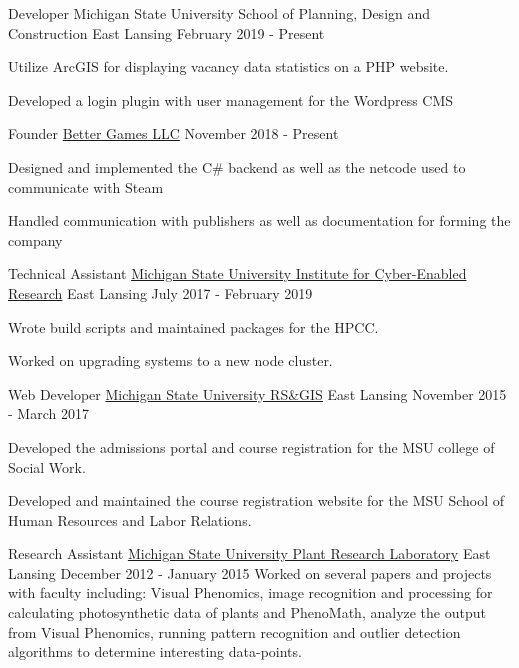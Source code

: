 
\begin{cventries}
  \cventry
  {Developer}
  {Michigan State University School of Planning, Design and Construction}
  {East Lansing}
  {February 2019 - Present}
  {
    \begin{cvitems}
      \item {Utilize ArcGIS for displaying vacancy data statistics on a PHP website.}
      \item {Developed a login plugin with user management for the Wordpress CMS}
    \end{cvitems}
  }

  \cventry
    {Founder} %
    {\href{https://better-games.org}{Better Games LLC}} %
    {} %
    {November 2018 - Present} %
    {
        \begin{cvitems}
          \item {Designed and implemented the C\# backend as well as the netcode used to communicate with Steam}
          \item {Handled communication with publishers as well as documentation for forming the company}
        \end{cvitems}
    }

  \cventry
    {Technical Assistant}
    {\href{https://icer.msu.edu}{Michigan State University Institute for Cyber-Enabled Research}}
    {East Lansing}
    {July 2017 - February 2019}
    {
      \begin{cvitems}
        \item {Wrote build scripts and maintained packages for the HPCC.}
        \item {Worked on upgrading systems to a new node cluster.}
      \end{cvitems}
    }

  \cventry
    {Web Developer}
    {\href{http://www.rsgis.msu.edu}{Michigan State University RS\&GIS}}
    {East Lansing}
    {November 2015 - March 2017}
    {
      \begin{cvitems}
        \item {Developed the admissions portal and course registration for the MSU college of Social Work.}
        \item {Developed and maintained the course registration website for the MSU School of Human Resources and Labor Relations.}
      \end{cvitems}
    }

  \cventry
    {Research Assistant}
    {\href{https://prl.natsci.msu.edu/research-tech/center-for-advanced-algal-and-plant-phenotyping}{Michigan State University Plant Research Laboratory}}
    {East Lansing}
    {December 2012 - January 2015}
    {
      {Worked on several papers and projects with faculty including: Visual Phenomics, image recognition
      and processing for calculating photosynthetic data of plants and PhenoMath, analyze the output from Visual Phenomics,
      running pattern recognition and outlier detection algorithms to determine interesting data-points. }
    }
\end{cventries}
